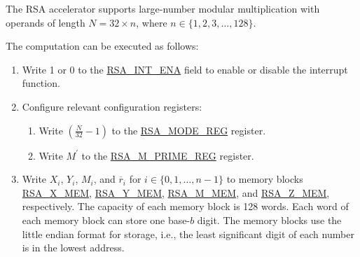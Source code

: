\documentclass[main\_\_EN.tex]{subfiles}
\begin{document}
The RSA accelerator supports large-number modular multiplication with operands of length \begin{math}N = 32 \times n\end{math}, where \begin{math}n \in \{ 1,2,3, \dots, 128\} \end{math}.

The computation can be executed as follows:

\begin{enumerate}

    \item Write 1 or 0 to the \hyperref[fielddesc:RSAINTENA]{RSA\_INT\_ENA} field to enable or disable the interrupt function.

    \item Configure relevant configuration registers:

    \begin{enumerate}
        \item Write \begin{math}( \frac{N}{32} - 1 )\end{math} to the \hyperref[regdesc:RSAMODEREG]{RSA\_MODE\_REG} register.

        \item Write \begin{math}M^{\prime}\end{math} to the \hyperref[regdesc:RSAMPRIMEREG]{RSA\_M\_PRIME\_REG} register.

    \end{enumerate}

    \item Write
        \begin{math}X_{i}\end{math},
        \begin{math}Y_{i}\end{math},
        \begin{math}M_{i}\end{math}, and
        \begin{math}\overline{r}_{i}\end{math} for \begin{math}i \in \{ 0, 1, \dots, n-1 \} \end{math} to memory blocks \hyperref[regdesc:RSAmemory]{RSA\_X\_MEM}, \hyperref[regdesc:RSAmemory]{RSA\_Y\_MEM}, \hyperref[regdesc:RSAmemory]{RSA\_M\_MEM}, and \hyperref[regdesc:RSAmemory]{RSA\_Z\_MEM}, respectively. The capacity of each memory block is 128 words. Each word of each memory block can store one base-\begin{math}b\end{math} digit. The memory blocks use the little endian format for storage, i.e., the least significant digit of each number is in the lowest address.


\end{enumerate}
\end{document}
